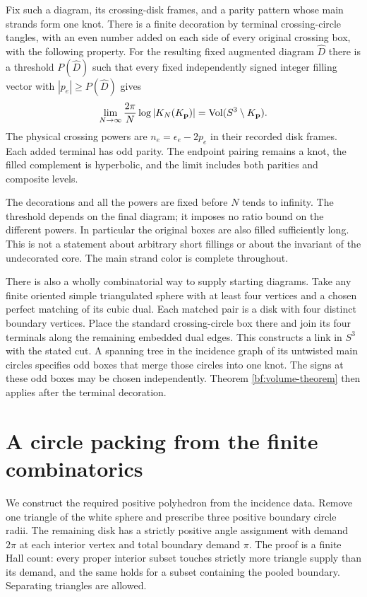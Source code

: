 \begin{theorem}
\label{bf:volume-theorem}
Fix such a diagram, its crossing-disk frames, and a parity pattern
whose main strands form one knot. There is a finite decoration by
terminal crossing-circle tangles, with an even number added on each
side of every original crossing box, with the following property.
For the resulting fixed augmented diagram $\widehat D$ there is a
threshold $P(\widehat D)$ such that every fixed independently signed
integer filling vector with $|p_e|\ge P(\widehat D)$ gives
\begin{equation}\label{bf:volume}
 \lim_{N\to\infty}\frac{2\pi}{N}\log|K_N(K_{\mathbf p})|
             =\operatorname{Vol}(S^3\setminus K_{\mathbf p}).
\end{equation}
The physical crossing powers are $n_e=\epsilon_e-2p_e$ in their
recorded disk frames. Each added terminal has odd parity. The endpoint
pairing remains a knot, the filled complement is hyperbolic, and the
limit includes both parities and composite levels.
\end{theorem}

The decorations and all the powers are fixed before $N$ tends to
infinity. The threshold depends on the final diagram; it imposes no
ratio bound on the different powers. In particular the original boxes
are also filled sufficiently long. This is not a statement about
arbitrary short fillings or about the invariant of the undecorated
core. The main strand color is complete throughout.

There is also a wholly combinatorial way to supply starting diagrams.
Take any finite oriented simple triangulated sphere with at least four
vertices and a chosen perfect matching of its cubic dual. Each matched
pair is a disk with four distinct boundary vertices. Place the standard
crossing-circle box there and join its four terminals along the
remaining embedded dual edges. This constructs a link in $S^3$ with
the stated cut. A spanning tree in the incidence graph of its untwisted
main circles specifies odd boxes that merge those circles into one knot.
The signs at these odd boxes may be chosen independently. Theorem
\ref{bf:volume-theorem} then applies after the terminal decoration.

\section{A circle packing from the finite combinatorics}

We construct the required positive polyhedron from the incidence data.
Remove one
triangle of the white sphere and prescribe three positive boundary
circle radii. The remaining disk has a strictly positive angle
assignment with demand $2\pi$ at each interior vertex and total
boundary demand $\pi$. The proof is a finite Hall count: every proper
interior subset touches strictly more triangle supply than its demand,
and the same holds for a subset containing the pooled boundary.
Separating triangles are allowed.

